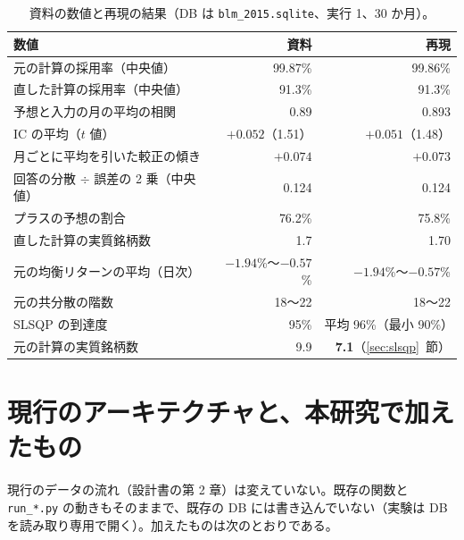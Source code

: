 \documentclass[xelatex,ja=standard,jafont=haranoaji,a4paper,10pt,openany]{bxjsreport}
\newcommand{\code}[1]{\texttt{#1}}
\newcommand{\secref}[1]{\ref{#1}~節}
\begin{document}
\begin{table}[htbp]
\centering
\caption{資料の数値と再現の結果（DB は \code{blm\_2015.sqlite}、実行 1、30 か月）。}
\label{tab:repro}
\small
\begin{tabular}{lrr}
\toprule
数値 & 資料 & 再現 \\
\midrule
元の計算の採用率（中央値） & 99.87\% & 99.86\% \\
直した計算の採用率（中央値） & 91.3\% & 91.3\% \\
予想と入力の月の平均の相関 & 0.89 & 0.893 \\
IC の平均（$t$ 値） & $+0.052$（1.51） & $+0.051$（1.48） \\
月ごとに平均を引いた較正の傾き & $+0.074$ & $+0.073$ \\
回答の分散 $\div$ 誤差の 2 乗（中央値） & 0.124 & 0.124 \\
プラスの予想の割合 & 76.2\% & 75.8\% \\
直した計算の実質銘柄数 & 1.7 & 1.70 \\
元の均衡リターンの平均（日次） & $-1.94$\%〜$-0.57$\% & $-1.94$\%〜$-0.57$\% \\
元の共分散の階数 & 18〜22 & 18〜22 \\
SLSQP の到達度 & 95\% & 平均 96\%（最小 90\%） \\
元の計算の実質銘柄数 & 9.9 & \textbf{7.1}（\secref{sec:slsqp}） \\
\bottomrule
\end{tabular}
\end{table}

\chapter{現行のアーキテクチャと、本研究で加えたもの}\label{ch:arch}

現行のデータの流れ（設計書の第 2 章）は変えていない。既存の関数と \code{run\_*.py} の動きもそのままで、既存の DB には書き込んでいない（実験は DB を読み取り専用で開く）。加えたものは次のとおりである。
\end{document}
